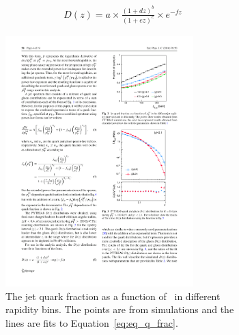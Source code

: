 \begin{align}
D(z) = a \times \frac{(1+dz)^b}{(1+ez)^c} \times e^{-fz}
\label{eq:ff_param}
\end{align}


\begin{figure}
\begin{subfigure}{.45\textwidth}
  \centering
\includegraphics[width=0.8\textwidth]{figures/jetMeasurements/jetQuarkFraction}
\caption{The jet quark fraction as a function of \ptjet\ in different rapidity bins. The points are from  simulations and the lines are fits to Equation~\ref{eq:eq_q_frac}.}
\label{fig:raa_centDep}
\end{subfigure} \qquad
\begin{subfigure}{.45\textwidth}
  \centering

\end{subfigure}
\end{figure}
